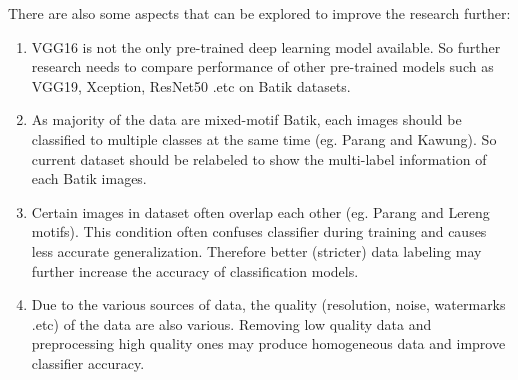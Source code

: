 \documentclass[conference, compsoc]{IEEEtran}
\begin{document}
There are also some aspects that can be explored to improve the research further:

\begin{enumerate}
	\item VGG16 is not the only pre-trained deep learning model available. So further research needs to compare performance of other pre-trained models such as VGG19\cite{simonyan2014very}, Xception\cite{chollet2016xception}, ResNet50\cite{he2016deep} .etc on Batik datasets.
	\item As majority of the data are mixed-motif Batik, each images should be classified to multiple classes at the same time (eg. Parang and Kawung). So current dataset should be relabeled to show the multi-label information of each Batik images.
	\item Certain images in dataset often overlap each other (eg. Parang and Lereng motifs). This condition often confuses classifier during training and causes less accurate generalization. Therefore better (stricter) data labeling may further increase the accuracy of classification models.
	\item Due to the various sources of data, the quality (resolution, noise, watermarks .etc) of the data are also various. Removing low quality data and preprocessing high quality ones may produce homogeneous data and improve classifier accuracy.
\end{enumerate}


%
%
\end{document}
